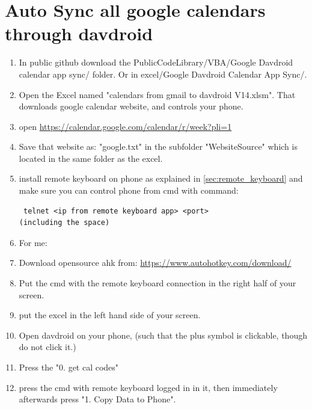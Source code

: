 \section{Auto Sync all google calendars through davdroid}\label{sec:ch10}
\begin{enumerate}
    \item In public github download the PublicCodeLibrary/VBA/Google Davdroid calendar app sync/ folder. Or in excel/Google Davdroid Calendar App Sync/.
    \item Open the Excel named "calendars from gmail to davdroid V14.xlsm". That downloads google calendar website, and controls your phone.
    \item open \url{https://calendar.google.com/calendar/r/week?pli=1}
    \item Save that website as: "google.txt" in the subfolder "WebsiteSource" which is located in the same folder as the excel.
    \item install remote keyboard on phone as explained in \cref{sec:remote_keyboard} and make sure you can control phone from cmd with command: 
\begin{verbatim}
 telnet <ip from remote keyboard app> <port>
(including the space)
\end{verbatim}
    \item For me:

    \item Download opensource ahk from: \url{https://www.autohotkey.com/download/}
    \item Put the cmd with the remote keyboard connection in the right half of your screen.
    \item put the excel in the left hand side of your screen.
    \item Open davdroid on your phone, (such that the plus symbol is clickable, though do not click it.)
    \item Press the "0. get cal codes" 
    \item press the cmd with remote keyboard logged in in it, then immediately afterwards press "1. Copy Data to Phone".
\end{enumerate}

